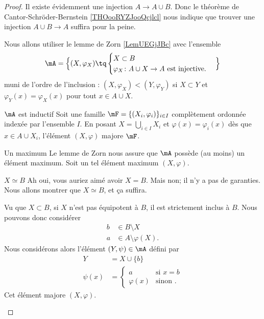 \begin{proof}
    Il existe évidemment une injection \( A\to A\cup B\). Donc le théorème de Cantor-Schröder-Bernstein \ref{THOooRYZJooQcjlcl} nous indique que trouver une injection \( A\cup B\to A\) suffira pour la peine.

    Nous allons utiliser le lemme de Zorn \ref{LemUEGjJBc} avec l'ensemble
    \begin{equation}
       \mA=\Big\{  (X,\varphi_X)  \tq
        \begin{cases}
            X\subset B\\
            \varphi_X\colon A\cup X\to A\text{ est injective.}
        \end{cases}
    \Big\}
    \end{equation}
    muni de l'ordre de l'inclusion : \( (X,\varphi_X)<(Y,\varphi_Y)\) si \( X\subset Y\) et \( \varphi_Y(x)=\varphi_X(x)\) pour tout \( x\in A\cup X\).
    
    \begin{subproof}
        \item[\( \mA\) est inductif]
            Soit une famille \( \mF=\{ (X_i,\varphi_i) \}_{i\in I}\) complètement ordonnée indexée par l'ensemble \( I\). En posant \( X=\bigcup_{i\in I}X_i\) et \( \varphi(x)=\varphi_i(x)\) dès que \( x\in A\cup X_i\), l'élément \( (X,\varphi)\) majore \( \mF\).
        \item[Un maximum]
            Le lemme de Zorn nous assure que \( \mA\) possède (au moins) un élément maximum. Soit un tel élément maximum \( (X,\varphi)\). 
        \item[\( X\simeq B\)]
            Ah oui, vous auriez aimé avoir \( X=B\). Mais non; il n'y a pas de garanties. Nous allons montrer que \( X\simeq B\), et ça suffira.

            Vu que \( X\subset B\), si \( X\) n'est pas équipotent à \( B\), il est strictement inclus à \( B\). Nous pouvons donc considérer
            \begin{subequations}
                \begin{align}
                    b&\in B\setminus X\\
                    a&\in A\setminus \varphi(X).
                \end{align}
            \end{subequations}
            Nous considérons alors l'élément \( (Y,\psi)\in \mA\) défini par
            \begin{subequations}
                \begin{align}
                    Y&=X\cup\{ b \}\\
                    \psi(x)&=\begin{cases}
                        a    &   \text{si } x=b\\
                        \varphi(x)    &    \text{sinon }.
                    \end{cases}
                \end{align}
            \end{subequations}
            Cet élément majore \( (X,\varphi)\).


\end{subproof}
\end{proof}
